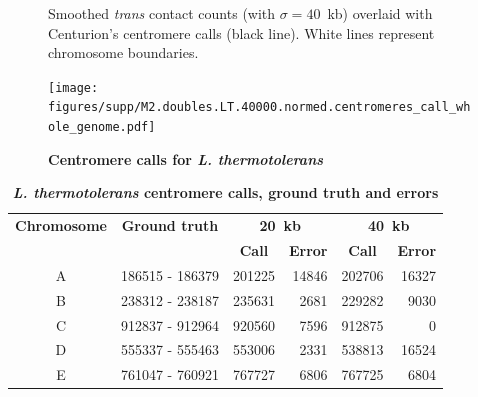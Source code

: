 \clearpage


\begin{figure}[ht!]
\caption{\textbf{Centromere calls for \textit{L. thermotolerans}}}{
Smoothed \textit{trans} contact counts (with $\sigma=40$~kb) overlaid with
Centurion's centromere calls (black line). White lines represent chromosome
boundaries.
}

\begin{center}
\texttt{[image: figures/supp/M2.doubles.LT.40000.normed.centromeres\_call\_whole\_genome.pdf]}
\end{center}
\label{suppfig:LT_calls}
\end{figure}


\begin{table}[ht!]
\caption{\textbf{\textit{L. thermotolerans} centromere calls, ground truth and errors}}
\begin{center}
\begin{tabular}{c | c  r  r  r  r}
\textbf{Chromosome}  & \textbf{Ground truth} & \multicolumn{2}{c}{\textbf{20~kb}} & \multicolumn{2}{c}{\textbf{40~kb}} \\
  &   &  \multicolumn{1}{c}{\textbf{Call}} &  \multicolumn{1}{c}{\textbf{Error}} &  \multicolumn{1}{c}{\textbf{Call}} &  \multicolumn{1}{c}{\textbf{Error}} \\
\hline
A & \num[group-separator={\,}]{186515} - \num[group-separator={\,}]{186379} & \num[group-separator={\,}]{201225} & \small{\num[group-separator={\,}]{14846}}  & \num[group-separator={\,}]{202706} & \small{\num[group-separator={\,}]{16327}}  \\
B & \num[group-separator={\,}]{238312} - \num[group-separator={\,}]{238187} & \num[group-separator={\,}]{235631} & \small{\num[group-separator={\,}]{2681}}  & \num[group-separator={\,}]{229282} & \small{\num[group-separator={\,}]{9030}}  \\
C & \num[group-separator={\,}]{912837} - \num[group-separator={\,}]{912964} & \num[group-separator={\,}]{920560} & \small{\num[group-separator={\,}]{7596}}  & \num[group-separator={\,}]{912875} & \small{\num[group-separator={\,}]{0}}  \\
D & \num[group-separator={\,}]{555337} - \num[group-separator={\,}]{555463} & \num[group-separator={\,}]{553006} & \small{\num[group-separator={\,}]{2331}}  & \num[group-separator={\,}]{538813} & \small{\num[group-separator={\,}]{16524}}  \\
E & \num[group-separator={\,}]{761047} - \num[group-separator={\,}]{760921} & \num[group-separator={\,}]{767727} & \small{\num[group-separator={\,}]{6806}}  & \num[group-separator={\,}]{767725} & \small{\num[group-separator={\,}]{6804}}  \\

\end{tabular}
\end{center}
\end{table}
